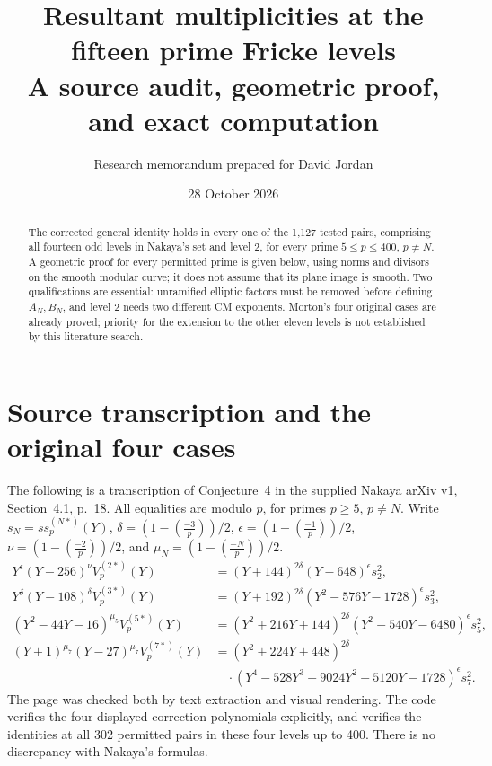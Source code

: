 \documentclass[11pt,a4paper]{article}
\title{Resultant multiplicities at the fifteen prime Fricke levels\\[3pt]\large A source audit, geometric proof, and exact computation}
\author{Research memorandum prepared for David Jordan}
\date{28 October 2026}
\begin{document}
\maketitle
\begin{abstract}
The corrected general identity holds in every one of the 1,127 tested pairs, comprising all fourteen odd levels in Nakaya's set and level 2, for every prime $5\le p\le400$, $p\ne N$. A geometric proof for every permitted prime is given below, using norms and divisors on the smooth modular curve; it does not assume that its plane image is smooth. Two qualifications are essential: unramified elliptic factors must be removed before defining $A_N,B_N$, and level 2 needs two different CM exponents. Morton's four original cases are already proved; priority for the extension to the other eleven levels is not established by this literature search.
\end{abstract}

\section{Source transcription and the original four cases}
The following is a transcription of Conjecture~4 in the supplied Nakaya arXiv v1, Section~4.1, p.~18. All equalities are modulo $p$, for primes $p\ge5$, $p\ne N$. Write $s_N=ss_p^{(N*)}(Y)$,
$\delta=(1-(\frac{-3}{p}))/2$, $\epsilon=(1-(\frac{-1}{p}))/2$,
$\nu=(1-(\frac{-2}{p}))/2$, and $\mu_N=(1-(\frac{-N}{p}))/2$.
\begin{align*}
 Y^\epsilon(Y-256)^\nu V_p^{(2*)}(Y)
 &= (Y+144)^{2\delta}(Y-648)^\epsilon s_2^2,\\
 Y^\delta(Y-108)^\delta V_p^{(3*)}(Y)
 &= (Y+192)^{2\delta}(Y^2-576Y-1728)^\epsilon s_3^2,\\
 (Y^2-44Y-16)^{\mu_5}V_p^{(5*)}(Y)
 &= (Y^2+216Y+144)^{2\delta}(Y^2-540Y-6480)^\epsilon s_5^2,\\
 (Y+1)^{\mu_7}(Y-27)^{\mu_7}V_p^{(7*)}(Y)
 &= (Y^2+224Y+448)^{2\delta}\\[-2pt]
 &\quad\cdot(Y^4-528Y^3-9024Y^2-5120Y-1728)^\epsilon s_7^2.
\end{align*}
The page was checked both by text extraction and visual rendering. The code verifies the four displayed correction polynomials explicitly, and verifies the identities at all 302 permitted pairs in these four levels up to 400. There is no discrepancy with Nakaya's formulas.
\end{document}
